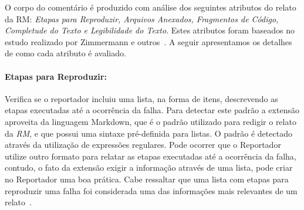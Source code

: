 \begin{table}[htpb]
\centering
{}
\caption{Critérios de aceitação e forma de análise utilizados na análise de
    qualidade do relato.}
\label{tab:criterios_analise_qualidade_relato}
\end{table}

O corpo do comentário é produzido com análise dos seguintes atributos do relato
da RM\@: \textit{Etapas para Reproduzir, Arquivos Anexados, Fragmentos de
    Código, Completude do Texto e Legibilidade do Texto}. Estes atributos foram
baseados no estudo realizado por Zimmermann e
outros~\cite{zimmermann2010makes}.  A seguir apresentamos os detalhes de como
cada atributo é avaliado.

\paragraph{Etapas para Reproduzir:}
\label{par:etapas_para_reproduzir_}

Verifica se o reportador incluiu uma lista, na forma de itens, descrevendo as
etapas executadas até a ocorrência da falha. Para detectar este padrão a
extensão aproveita da linguagem Markdown, que é o padrão utilizado para redigir
o relato da \textit{RM}, e que possui uma sintaxe pré-definida para listas. O
padrão é detectado através da utilização de expressões regulares. Pode ocorrer
que o Reportador utilize outro formato para relatar as etapas executadas até a
ocorrência da falha, contudo, o fato da extensão exigir a informação através de
uma lista, pode criar no Reportador uma boa prática. Cabe ressaltar que uma
lista com etapas para reproduzir uma falha foi considerada uma das informações
mais relevantes de um relato~\cite{zimmermann2010makes}.

